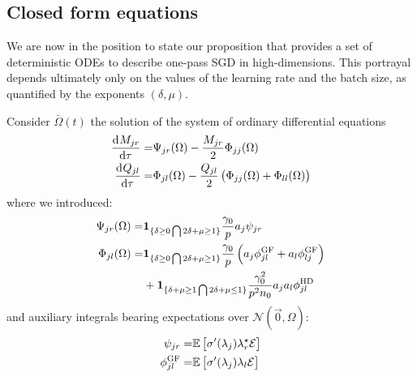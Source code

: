 \subsection{Closed form equations}
We are now in the position to state our proposition that
provides a set of deterministic ODEs to describe one-pass SGD in high-dimensions.
This portrayal depends ultimately only on the values of the learning rate and the batch size, as quantified by the exponents \((\delta, \mu) \). 
\begin{proposition}
\label{2406:prop:main:exact_asympt}
Consider \(\bar\Omega(t)\) the solution of the system of ordinary differential equations
\begin{equation}
\label{2406:eq:spherical_closed_form_ode}
\begin{split}
    \dod{M_{jr}}{\tau} =& \Psi_{jr}{(\Omega)} - \frac{M_{jr}}{2}\Phi_{jj}{(\Omega)} \\
    \dod{Q_{jl}}{\tau} =& \Phi_{jl}{(\Omega)} - \frac{Q_{jl}}{2}\left(\Phi_{jj}{(\Omega)} + \Phi_{ll}{(\Omega)}\right)
\end{split}
\end{equation}
where we introduced:
\begin{equation}
\label{2406:eq:informal_ODE}
\begin{split}
    \Psi_{jr}(\Omega) =&  \mathbf{1}_{\{\delta\ge0 \bigcap 2\delta+\mu\ge1\}}\frac{\gamma_0}{p}a_j \psi_{jr}  \\
    \Phi_{jl}(\Omega) =&  \mathbf{1}_{\{\delta\ge0 \bigcap 2\delta+\mu\ge1\}}\frac{\gamma_0}{p}\left(a_j\phi^{\rm{GF}}_{jl}+a_l\phi^{\rm{GF}}_{lj}\right) \\
        &+\mathbf{1}_{\{\delta+\mu\ge1 \bigcap 2\delta+\mu\le1\}}\frac{\gamma_0^2}{p^2n_0}a_j a_l \phi^{\rm{HD}}_{jl}
\end{split}\end{equation}
and auxiliary integrals bearing expectations over $\mathcal{N}(\vec 0, \Omega)$:
\begin{align*}
    \psi_{jr} =&\mathbb{E}\left[ \sigma'(\lambda_j)\lambda^{\star}_{r} \mathcal{E} \right] \\
    \phi^{\rm{GF}}_{jl}=&\mathbb{E}\left[ \sigma'(\lambda_j)\lambda_{l} \mathcal{E} \right] \\

\end{align*}
\end{proposition}
